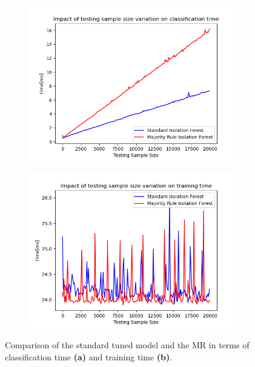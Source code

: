 \documentclass[futureinternet,article,submit,pdftex,moreauthors]{Definitions/mdpi}
\begin{document}
\begin{figure}[H]
	\centering
	\begin{subfigure}{0.49\textwidth}
		\centering
		\includegraphics[width=\textwidth]{img/classificationTimeComparison.png}
		\caption{}
		\label{fig:majority_rule_classification_time}
	\end{subfigure}
	\hfill
	\begin{subfigure}{0.49\textwidth}
		\centering
		\includegraphics[width=\textwidth]{img/trainingTimeComparison.png}
		\caption{}
		\label{fig:majority_rule_training_time}
	\end{subfigure}
	\caption{Comparison of the standard tuned model and the MR in terms of classification time \textbf{(a)} and training time \textbf{(b)}.}
	\label{fig:majority_rule_time_comparison}
\end{figure}
\end{document}
